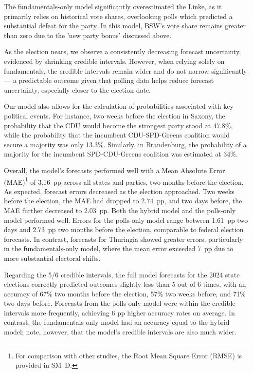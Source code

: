 \documentclass[12pt]{article}
\begin{document}
\begin{doublespacing}
The fundamentals-only model significantly overestimated the Linke, as it primarily relies on historical vote shares, overlooking polls which predicted a substantial defeat for the party. In this model, BSW's vote share remains greater than zero due to the 'new party bonus' discussed above.

As the election nears, we observe a consistently decreasing forecast uncertainty, evidenced by shrinking credible intervals. However, when relying solely on fundamentals, the credible intervals remain wider and do not narrow significantly — a predictable outcome given that polling data helps reduce forecast uncertainty, especially closer to the election date.

Our model also allows for the calculation of probabilities associated with key political events. For instance, two weeks before the election in Saxony, the probability that the CDU would become the strongest party stood at 47.8\%, while the probability that the incumbent CDU-SPD-Greens coalition would secure a majority was only 13.3\%. Similarly, in Brandenburg, the probability of a majority for the incumbent SPD-CDU-Greens coalition was estimated at 34\%.

Overall, the model's forecasts performed well with a Mean Absolute Error (MAE)\footnote{For comparison with other studies, the Root Mean Square Error (RMSE) is provided in SM~D.} of 3.16~pp across all states and parties, two months before the election. As expected, forecast errors decreased as the election approached. Two weeks before the election, the MAE had dropped to 2.74~pp, and two days before, the MAE further decreased to 2.03~pp. Both the hybrid model and the polls-only model performed well. Errors for the polls-only model range between 1.61~pp two days and 2.73~pp two months before the election, comparable to federal election forecasts. In contrast, forecasts for Thuringia showed greater errors, particularly in the fundamentals-only model, where the mean error exceeded 7~pp due to more substantial electoral shifts.

Regarding the 5/6 credible intervals, the full model forecasts for the 2024 state elections correctly predicted outcomes slightly less than 5 out of 6 times, with an accuracy of 67\% two months before the election, 57\% two weeks before, and 71\% two days before. Forecasts from the polls-only model were within the credible intervals more frequently, achieving 6 pp higher accuracy rates on average. In contrast, the fundamentals-only model had an accuracy equal to the hybrid model; note, however, that the model's credible intervals are also much wider.



\end{doublespacing}
\end{document}
